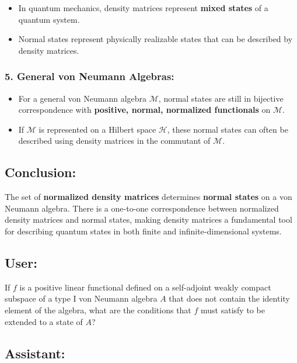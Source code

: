 \documentclass{article}
\begin{document}
\begin{itemize}
\item In quantum mechanics, density matrices represent \textbf{mixed states}
of a quantum system. 

\item Normal states represent physically realizable states that can be
described by density matrices.
\end{itemize}

\subsubsection*{5. \textbf{General von Neumann Algebras}:}

\begin{itemize}
\item For a general von Neumann algebra $\mathcal{M}$, normal states are
still in bijective correspondence with \textbf{positive, normal, normalized
functionals} on $\mathcal{M}$. 

\item If $\mathcal{M}$ is represented on a Hilbert space $\mathcal{H}$,
these normal states can often be described using density matrices in the
commutant of $\mathcal{M}$.
\end{itemize}

\subsection*{Conclusion:}

The set of \textbf{normalized density matrices} determines \textbf{normal
states} on a von Neumann algebra. There is a one-to-one correspondence
between normalized density matrices and normal states, making density
matrices a fundamental tool for describing quantum states in both finite and
infinite-dimensional systems.

\subsection*{User:}

If $f $ is a positive linear functional defined on a self-adjoint weakly
compact subspace of a type I von Neumann algebra $A $ that does not contain
the identity element of the algebra, what are the conditions that $f $ must
satisfy to be extended to a state of $A $?

\subsection*{Assistant:}
\end{document}
